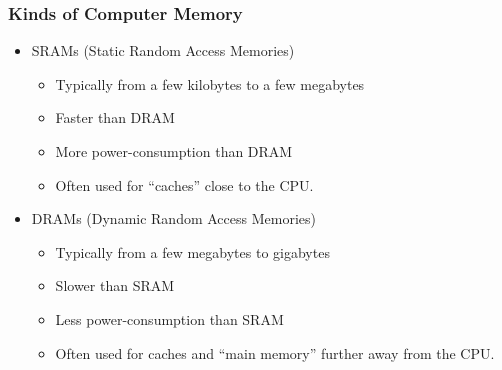 \begin{frame}
\frametitle{Kinds of Computer Memory}

\begin{center}
\end{center}

{\footnotesize
\begin{itemize}
 \item SRAMs (Static Random Access Memories)
       \begin{itemize}
        \item Typically from a few kilobytes to a few megabytes
	\item Faster than DRAM
	\item More power-consumption than DRAM
	\item Often used for ``caches'' close to the CPU.
       \end{itemize}

 \item DRAMs (Dynamic Random Access Memories)
       \begin{itemize}
        \item Typically from a few megabytes to gigabytes
	\item Slower than SRAM
	\item Less power-consumption than SRAM
	\item Often used for caches and ``main memory'' further away from the CPU.
       \end{itemize}
\end{itemize}}

\end{frame}


